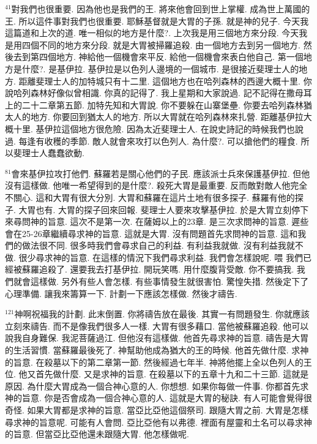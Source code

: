 \documentclass{book}
\begin{document}
$^{41}$對我們也很重要.
因為他也是我們的王.
將來他會回到世上掌權.
成為世上萬國的王.
所以這件事對我們也很重要.
耶穌基督就是大胃的子孫.
就是神的兒子.
今天我這篇道和上次的道.
唯一相似的地方是什麼?.
上次我是用三個地方來分段.
今天我是用四個不同的地方來分段.
就是大胃被掃羅追殺.
由一個地方去到另一個地方.
然後去到第四個地方.
神給他一個機會來平反.
給他一個機會來表白他自己.
第一個地方是什麼?.
是基伊拉.
基伊拉是以色列人邊境的一個城市.
是很接近斐理士人的地方.
距離斐理士人的加特城只有十二里.
這個地方也在哈列森林的西邊大概十里.
你說哈列森林好像似曾相識.
你真的記得了.
我上星期和大家說過.
記不記得在撒母耳上的二十二章第五節.
加特先知和大胃說.
你不要躲在山寨堡壘.
你要去哈列森林猶太人的地方.
你要回到猶太人的地方.
所以大胃就在哈列森林來扎營.
距離基伊拉大概十里.
基伊拉這個地方很危險.
因為太近斐理士人.
在說史詩記的時候我們也說過.
每逢有收穫的季節.
敵人就會來攻打以色列人.
為什麼?.
可以搶他們的糧食.
所以斐理士人蠢蠢欲動.

$^{81}$會來基伊拉攻打他們.
蘇羅若是關心他們的子民.
應該派士兵來保護基伊拉.
但他沒有這樣做.
他唯一希望得到的是什麼?.
殺死大胃是最重要.
反而敵對敵人他完全不關心.
這和大胃有很大分別.
大胃和蘇羅在這片土地有很多探子.
蘇羅有他的探子.
大胃也有.
大胃的探子回來回報.
斐理士人要來攻擊基伊拉.
於是大胃立刻停下來尋問神的旨意.
這次不是第一次.
在薩姆以上的23章.
是三次求問神的旨意.
遲些會在25-26章繼續尋求神的旨意.
這就是大胃.
沒有問題首先求問神的旨意.
這和我們的做法很不同.
很多時我們會尋求自己的利益.
有利益我就做.
沒有利益我就不做.
很少尋求神的旨意.
在這樣的情況下我們尋求利益.
我們會怎樣說呢.
喂 我們已經被蘇羅追殺了.
還要我去打基伊拉.
開玩笑嗎.
用什麼腹背受敵.
你不要搞我.
我們就會這樣做.
另外有些人會怎樣.
有些事情發生就很害怕.
驚惶失措.
然後定下了心理準備.
讓我來籌算一下.
計劃一下應該怎樣做.
然後才禱告.

$^{121}$神啊祝福我的計劃.
此末倒置.
你將禱告放在最後.
其實一有問題發生.
你就應該立刻來禱告.
而不是像我們很多人一樣.
大胃有很多藉口.
當他被蘇羅追殺.
他可以說我自身難保.
我泥菩薩過江.
但他沒有這樣做.
他首先尋求神的旨意.
禱告是大胃的生活習慣.
當蘇羅最後死了.
神幫助他成為猶大的王的時候.
他首先做什麼.
求神的旨意.
在殺墓以下的第二章第一節.
然後經過七年半.
神將他擺上全以色列人的王位.
他又首先做什麼.
又是求神的旨意.
在殺墓以下的五章十九和二十三節.
這就是原因.
為什麼大胃成為一個合神心意的人.
你想想.
如果你每做一件事.
你都首先求神的旨意.
你是否會成為一個合神心意的人.
這就是大胃的秘訣.
有人可能會覺得很奇怪.
如果大胃都是求神的旨意.
當亞比亞他這個祭司.
跟隨大胃之前.
大胃是怎樣尋求神的旨意呢.
可能有人會問.
亞比亞他有以弗德.
裡面有屋靈和土名可以尋求神的旨意.
但當亞比亞他還未跟隨大胃.
他怎樣做呢.
\end{document}
